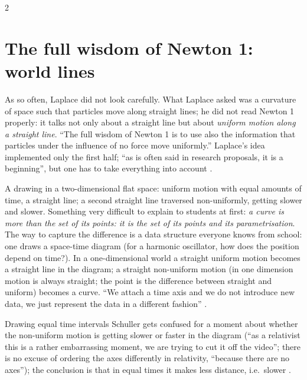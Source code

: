 \begin{paracol}{2}
\section{The full wisdom of Newton 1: world lines}\label{sec:c09-worldlines}

As so often, Laplace did not look carefully. What Laplace asked was a curvature of space such that particles move along straight lines; he did not read Newton 1 properly: it talks not only about a straight line but about \emph{uniform motion along a straight line}. ``The full wisdom of Newton 1 is to use also the information that particles under the influence of no force move uniformly.'' Laplace's idea implemented only the first half; ``as is often said in research proposals, it is a beginning'', but one has to take everything into account .

A drawing in a two-dimensional flat space: uniform motion with equal amounts of time, a straight line; a second straight line traversed non-uniformly, getting slower and slower. Something very difficult to explain to students at first: \emph{a curve is more than the set of its points: it is the set of its points and its parametrisation}. The way to capture the difference is a data structure everyone knows from school: one draws a space-time diagram (for a harmonic oscillator, how does the position depend on time?). In a one-dimensional world a straight uniform motion becomes a straight line in the diagram; a straight non-uniform motion (in one dimension motion is always straight; the point is the difference between straight and uniform) becomes a curve. ``We attach a time axis and we do not introduce new data, we just represent the data in a different fashion''
.
\begin{coursenote}
Drawing equal time intervals Schuller gets confused for a moment about whether the non-uniform motion is getting slower or faster in the diagram (``as a relativist this is a rather embarrassing moment, we are trying to cut it off the video''; there is no excuse of ordering the axes differently in relativity, ``because there are no axes''); the conclusion is that in equal times it makes less distance, i.e.\ slower .
\end{coursenote}


\end{paracol}

